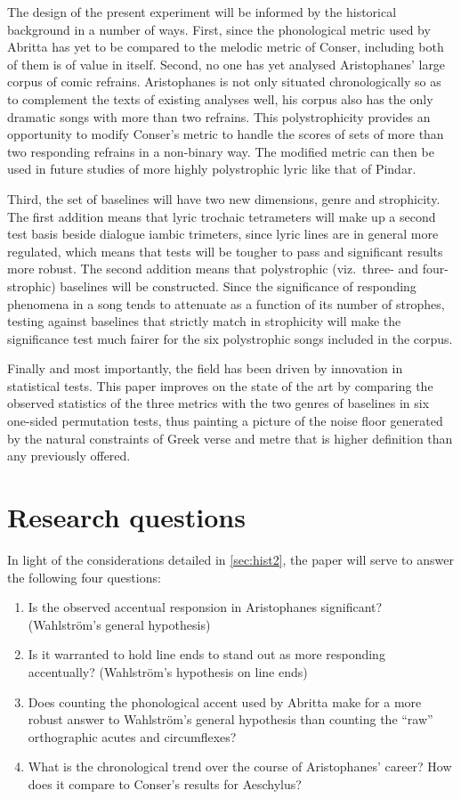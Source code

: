\documentclass[twoside]{article}
\begin{document}
The design of the present experiment will be informed by the historical background in a number of ways. First, since the phonological metric used by Abritta has yet to be compared to the melodic metric of Conser, including both of them is of value in itself. Second, no one has yet analysed Aristophanes' large corpus of comic refrains. Aristophanes is not only situated chronologically so as to complement the texts of existing analyses well, his corpus also has the only dramatic songs with more than two refrains. This polystrophicity provides an opportunity to modify Conser’s metric to handle the scores of sets of more than two responding refrains in a non-binary way. The modified metric can then be used in future studies of more highly polystrophic lyric like that of Pindar.

Third, the set of baselines will have two new dimensions, genre and strophicity. The first addition means that lyric trochaic tetrameters will make up a second test basis beside dialogue iambic trimeters, since lyric lines are in general more regulated, which means that tests will be tougher to pass and significant results more robust. The second addition means that polystrophic (viz.\ three- and four-strophic) baselines will be constructed. Since the significance of responding phenomena in a song tends to attenuate as a function of its number of strophes, testing against baselines that strictly match in strophicity will make the significance test much fairer for the six polystrophic songs included in the corpus.

Finally and most importantly, the field has been driven by innovation in statistical tests. This paper improves on the state of the art by comparing the observed statistics of the three metrics with the two genres of baselines in six one-sided permutation tests, thus painting a picture of the noise floor generated by the natural constraints of Greek verse and metre that is higher definition than any previously offered. 

\section{Research questions}

In light of the considerations detailed in \autoref{sec:hist2}, the paper will serve to answer the following four questions:

\begin{enumerate}
    \item Is the observed accentual responsion in Aristophanes significant? (Wahlström's general hypothesis)
    \item Is it warranted to hold line ends to stand out as more responding accentually? (Wahlström's hypothesis on line ends)
    \item Does counting the phonological accent used by Abritta make for a more robust answer to Wahlström's general hypothesis than counting the ``raw'' orthographic acutes and circumflexes? 
    \item What is the chronological trend over the course of Aristophanes' career? How does it compare to Conser's results for Aeschylus?
\end{enumerate}
\end{document}
